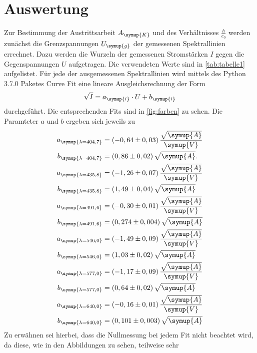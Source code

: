 \section{Auswertung}
\label{sec:Auswertung}
Zur Bestimmung der Austrittsarbeit $A_{\symup{K}}$ und des Verhältnisses $\frac{h}{e_0}$ werden zunächst die Grenzspannungen $U_{\symup{g}}$
der gemessenen Spektrallinien errechnet. Dazu werden die Wurzeln der gemessenen Stromstärken $I$ gegen die Gegenspannungen $U$ aufgetragen.
Die verwendeten Werte sind in \autoref{tab:tabelle1} aufgelistet. Für jede der ausgemessenen Spektrallinien wird mittels des Python 3.7.0 Paketes Curve Fit
eine lineare Ausgleichsrechnung der Form 
\begin{equation}
\label{eqn:ausgleich1}
  \sqrt{I} = a_{\symup{i}} \cdot U + b_{\symup{i}} 
\end{equation}
durchgeführt. Die entsprechenden Fits sind in \autoref{fig:farben} zu sehen. Die Paramteter $a$ und $b$ ergeben sich jeweils zu 
\begin{align*}
  a_{\symup{\lambda = 404,7 }} &= (-0,64 \pm 0,03) \, \frac{\sqrt{\symup{A}}}{\symup{V}} \\
  b_{\symup{\lambda = 404,7 }} &= (0,86 \pm 0,02) \,  \sqrt{\symup{A}}. \\
  a_{\symup{\lambda = 435,8 }} &= (-1,26 \pm 0,07) \, \frac{\sqrt{\symup{A}}}{\symup{V}} \\
  b_{\symup{\lambda = 435,8 }} &= (1,49 \pm 0,04) \,  \sqrt{\symup{A}} \\
  a_{\symup{\lambda = 491,6 }} &= (-0,30 \pm 0,01) \, \frac{\sqrt{\symup{A}}}{\symup{V}} \\
  b_{\symup{\lambda = 491,6 }} &= (0,274 \pm 0,004) \, \sqrt{\symup{A}} \\
  a_{\symup{\lambda = 546,0 }} &= (-1,49 \pm 0,09) \, \frac{\sqrt{\symup{A}}}{\symup{V}} \\
  b_{\symup{\lambda = 546,0 }} &= (1,03 \pm 0,02) \,  \sqrt{\symup{A}} \\
  a_{\symup{\lambda = 577,0 }} &= (-1,17 \pm 0,09) \, \frac{\sqrt{\symup{A}}}{\symup{V}} \\
  b_{\symup{\lambda = 577,0 }} &= (0,64 \pm 0,02) \,  \sqrt{\symup{A}} \\
  a_{\symup{\lambda = 640,0}} &= (-0,16 \pm 0,01) \, \frac{\sqrt{\symup{A}}}{\symup{V}} \\
  b_{\symup{\lambda = 640,0}} &= (0,101 \pm 0,003) \,\sqrt{\symup{A}} \\
\end{align*} 
Zu erwähnen sei hierbei, dass die Nullmessung bei jedem Fit nicht beachtet wird, da diese, wie in den Abbildungen zu sehen, teilweise sehr 
